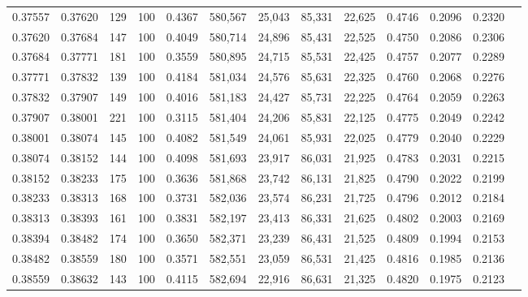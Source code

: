 \begin{tabular}{rrrrrrrrrrrrr}
0.37557 & 0.37620 &   129 & 100 &                                     0.4367 & 580,567 &  25,043 &  85,331 &  22,625 & 0.4746 & 0.2096 & 0.2320 \\
0.37620 & 0.37684 &   147 & 100 &                                     0.4049 & 580,714 &  24,896 &  85,431 &  22,525 & 0.4750 & 0.2086 & 0.2306 \\
0.37684 & 0.37771 &   181 & 100 &                                     0.3559 & 580,895 &  24,715 &  85,531 &  22,425 & 0.4757 & 0.2077 & 0.2289 \\
0.37771 & 0.37832 &   139 & 100 &                                     0.4184 & 581,034 &  24,576 &  85,631 &  22,325 & 0.4760 & 0.2068 & 0.2276 \\
0.37832 & 0.37907 &   149 & 100 &                                     0.4016 & 581,183 &  24,427 &  85,731 &  22,225 & 0.4764 & 0.2059 & 0.2263 \\
0.37907 & 0.38001 &   221 & 100 &                                     0.3115 & 581,404 &  24,206 &  85,831 &  22,125 & 0.4775 & 0.2049 & 0.2242 \\
0.38001 & 0.38074 &   145 & 100 &                                     0.4082 & 581,549 &  24,061 &  85,931 &  22,025 & 0.4779 & 0.2040 & 0.2229 \\
0.38074 & 0.38152 &   144 & 100 &                                     0.4098 & 581,693 &  23,917 &  86,031 &  21,925 & 0.4783 & 0.2031 & 0.2215 \\
0.38152 & 0.38233 &   175 & 100 &                                     0.3636 & 581,868 &  23,742 &  86,131 &  21,825 & 0.4790 & 0.2022 & 0.2199 \\
0.38233 & 0.38313 &   168 & 100 &                                     0.3731 & 582,036 &  23,574 &  86,231 &  21,725 & 0.4796 & 0.2012 & 0.2184 \\
0.38313 & 0.38393 &   161 & 100 &                                     0.3831 & 582,197 &  23,413 &  86,331 &  21,625 & 0.4802 & 0.2003 & 0.2169 \\
0.38394 & 0.38482 &   174 & 100 &                                     0.3650 & 582,371 &  23,239 &  86,431 &  21,525 & 0.4809 & 0.1994 & 0.2153 \\
0.38482 & 0.38559 &   180 & 100 &                                     0.3571 & 582,551 &  23,059 &  86,531 &  21,425 & 0.4816 & 0.1985 & 0.2136 \\
0.38559 & 0.38632 &   143 & 100 &                                     0.4115 & 582,694 &  22,916 &  86,631 &  21,325 & 0.4820 & 0.1975 & 0.2123 \\

\end{tabular}
